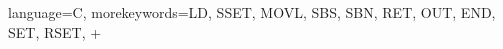  {
    language=C,
    morekeywords={LD, SSET, MOVL, SBS, SBN, RET, OUT, END, SET, RSET, +}
}

\newcommand{\IL}[3]{
    \kodeprintstyle{#1}{#2}{#3}{IL}{Instruction List}
}